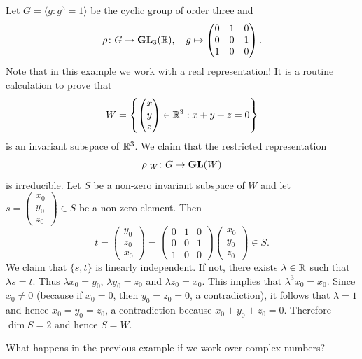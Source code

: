 \begin{example}
    Let $G=\langle g:g^3=1\rangle$ be the
    cyclic group of order three
    and
    \[
    \rho\colon G\to\mathbf{GL}_3(\mathbb{R}),
    \quad
    g\mapsto\begin{pmatrix}
        0&1&0\\
        0&0&1\\
        1&0&0
    \end{pmatrix}.
    \]
    Note that in this example we work with a real representation! 
    It is a routine calculation to prove that 
    \[
    W=\left\{
    \begin{pmatrix}
    x\\
    y\\
    z
    \end{pmatrix}\in\mathbb{R}^3:x+y+z=0\right\}
    \]
    is an invariant subspace of $\mathbb{R}^3$. We claim that the restricted representation 
    \[
      \rho|_W\colon G\to\mathbf{GL}(W)
    \]
    is irreducible. Let $S$ be a non-zero invariant subspace of 
    $W$ and let $s=\begin{pmatrix}x_0\\y_0\\z_0\end{pmatrix}\in S$ be a non-zero element. Then
    \[
    t=\begin{pmatrix}y_0\\z_0\\x_0\end{pmatrix}
    =\begin{pmatrix}
        0&1&0\\
        0&0&1\\
        1&0&0
    \end{pmatrix}
    \begin{pmatrix}x_0\\y_0\\z_0\end{pmatrix}\in S.
    \]
    We claim that $\{s,t\}$ is linearly independent. If not, there exists $\lambda\in\mathbb{R}$ such that
    $\lambda s=t$. Thus $\lambda x_0=y_0$, $\lambda y_0=z_0$ and $\lambda z_0=x_0$. This implies that
    $\lambda^3x_0=x_0$. Since $x_0\ne 0$ (because if $x_0=0$, then $y_0=z_0=0$, a contradiction), it follows that
    $\lambda=1$ and hence $x_0=y_0=z_0$, a contradiction because $x_0+y_0+z_0=0$.
    Therefore $\dim S=2$ and hence $S=W$.
\end{example}

What happens in the previous example if we work over complex numbers?

